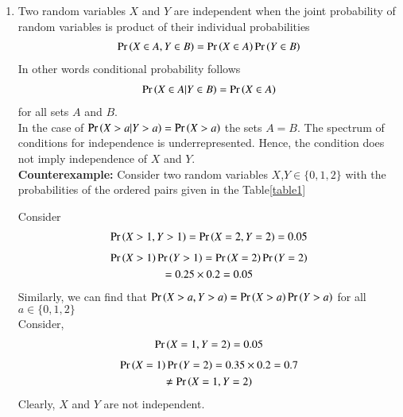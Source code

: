\documentclass[journal,12pt,twocolumn]{IEEEtran}
\begin{document}
\begin{enumerate}
    \item Two random variables $X$ and $Y$ are independent when the joint probability of random variables is product of their individual probabilities
    \begin{align}
        \label{eq1} \Pr\left(X\in A,Y \in B\right)=\Pr\left(X \in A\right)\Pr\left(Y \in B\right)
    \end{align}
    In other words conditional probability follows
    \begin{align}
        \Pr\left(X\in A|Y \in B\right)=\Pr\left(X \in A\right)
    \end{align}
    for all sets $A$ and $B$. \\
    In the case of $\Pr\left(X>a|Y>a\right)=\Pr\left(X>a\right)$ the sets $A=B$. The spectrum of conditions for independence is underrepresented. Hence, the condition does not imply independence of $X$ and $Y$.\\
    \textbf{Counterexample:} Consider two random variables $X$,$Y \in \{0,1,2\}$ with the probabilities of the ordered pairs  given in the Table\ref{table1}
    \begin{center}
    \begin{table}[h]
    \centering
    \caption{}
    \label{table1}
    \end{table}
    \end{center}
    
    Consider
    \begin{align}
        \Pr\left(X>1,Y>1\right)=\Pr\left(X=2,Y=2\right)=0.05
    \end{align}
    \begin{multline}
        \Pr\left(X>1\right)\Pr\left(Y>1\right)=\Pr\left(X=2\right)\Pr\left(Y=2\right)\\
        =0.25\times0.2=0.05
    \end{multline}
    Similarly, we can find that 
    $\Pr\left(X>a,Y>a\right)=\Pr\left(X>a\right)\Pr\left(Y>a\right)$ for all $a\in \{0,1,2\}$\\
    Consider,
    \begin{align}
        \Pr\left(X=1,Y=2\right)=0.05
    \end{align}
    \begin{multline}
        \Pr\left(X=1\right)\Pr\left(Y=2\right)=0.35\times0.2=0.7\\\neq\Pr\left(X=1,Y=2\right)
    \end{multline} 
    Clearly, $X$ and $Y$ are not independent. 
    

\end{enumerate}
\end{document}
